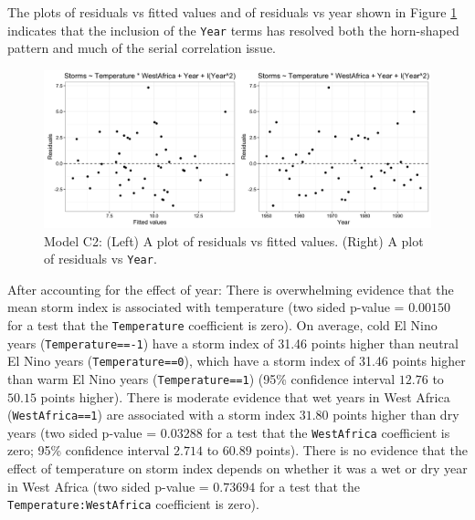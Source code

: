 \documentclass[11pt]{exam} %
\begin{document}
\begin{questions}
\begin{parts}
The plots of residuals vs fitted values and of residuals vs year shown in Figure \ref{fig:6c2_resid_serial} indicates that the inclusion of the \texttt{Year} terms has resolved both the horn-shaped pattern and much of the serial correlation issue.

\begin{figure}[!h]
	\centering
	\captionsetup{width=0.8\textwidth}
	\includegraphics[width=5.5in]{6c2_resid_serial.png}
	\caption{Model C2: (Left) A plot of residuals vs fitted values. (Right) A plot of residuals vs \texttt{Year}.}
	\label{fig:6c2_resid_serial}
\end{figure}

After accounting for the effect of year: There is overwhelming evidence that the mean storm index is associated with temperature (two sided p-value = $0.00150$ for a test that the \texttt{Temperature} coefficient is zero). On average, cold El Nino years (\texttt{Temperature==-1}) have a storm index of 31.46 points higher than neutral El Nino years (\texttt{Temperature==0}), which have a storm index of 31.46 points higher than warm El Nino years (\texttt{Temperature==1}) (95\% confidence interval $12.76$ to $50.15$ points higher). There is moderate evidence that wet years in West Africa (\texttt{WestAfrica==1}) are associated with a storm index $31.80$ points higher than dry years (two sided p-value = $0.03288$ for a test that the \texttt{WestAfrica} coefficient is zero; 95\% confidence interval $2.714$ to $60.89$ points). There is no evidence that the effect of temperature on storm index depends on whether it was a wet or dry year in West Africa (two sided p-value = $0.73694$ for a test that the \texttt{Temperature:WestAfrica} coefficient is zero).


\end{parts}


\end{questions}

\end{document}
